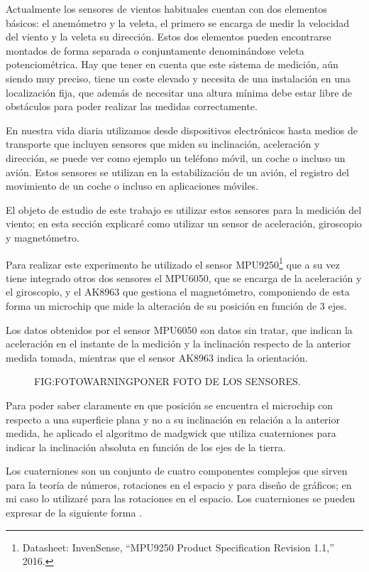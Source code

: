 
 Actualmente los sensores de vientos habituales cuentan con dos elementos básicos: el anemómetro y la veleta, el primero se encarga de medir la velocidad del viento y la veleta su dirección. Estos dos elementos pueden encontrarse montados de forma separada o conjuntamente denominándose veleta potenciométrica.
 Hay que tener en cuenta que este sistema de medición, aún siendo muy preciso, tiene un coste elevado y necesita de una instalación en una localización fija, que además de necesitar una altura mínima debe estar libre de obstáculos para poder realizar las medidas correctamente.
 
 En nuestra vida diaria utilizamos desde dispositivos electrónicos hasta medios de transporte que incluyen sensores que miden su inclinación, aceleración y dirección, se puede ver como ejemplo un teléfono móvil, un coche o incluso un avión.
 Estos sensores se utilizan en la estabilización de un avión, el registro del movimiento de un coche o incluso en aplicaciones móviles.
 
 El objeto de estudio de este trabajo es utilizar estos sensores para la medición del viento; en esta sección explicaré como utilizar un sensor de aceleración, giroscopio y magnetómetro.
 
 Para realizar este experimento he utilizado el sensor MPU9250\footnote{Datasheet: InvenSense, ``{MPU9250 Product Specification Revision 1.1},'' 2016.} que a su vez tiene integrado otros dos sensores el MPU6050, que se encarga de la aceleración y el giroscopio, y el AK8963 que gestiona el magnetómetro, componiendo de esta forma un microchip que mide la alteración de su posición en función de 3 ejes.
 
 Los datos obtenidos por el sensor MPU6050 son datos sin tratar, que indican la aceleración en el instante de la medición y la inclinación respecto de la anterior medida tomada, mientras que el sensor AK8963 indica la orientación.
 
\begin{figure}[Sensor MPU0250]{FIG:FOTOWARNING}{PONER FOTO DE LOS SENSORES.}
\end{figure}
 
 Para poder saber claramente en que posición se encuentra el microchip con respecto a una superficie plana y no a su inclinación en relación a la anterior medida, he aplicado el algoritmo de madgwick que utiliza cuaterniones para indicar la inclinación absoluta en función de los ejes de la tierra. 
 
 Los cuaterniones son un conjunto de cuatro componentes complejos que sirven para la teoría de números, rotaciones en el espacio y para diseño de gráficos; en mi caso lo utilizaré para las rotaciones en el espacio. Los cuaterniones se pueden expresar de la siguiente forma \cite{Graves1999}.
 
